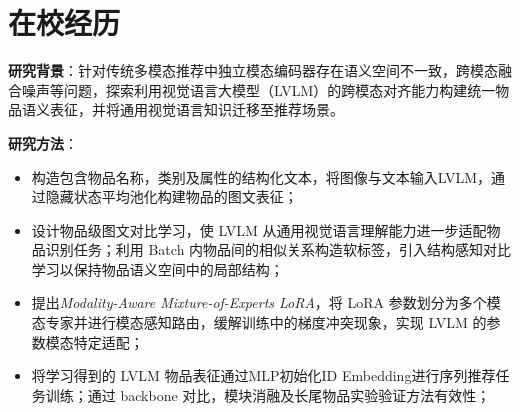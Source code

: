 \documentclass{resume}
\begin{document}




\vspace{0.5em}
\section{在校经历}



\textbf{研究背景}：针对传统多模态推荐中独立模态编码器存在语义空间不一致，跨模态融合噪声等问题，探索利用视觉语言大模型（LVLM）的跨模态对齐能力构建统一物品语义表征，并将通用视觉语言知识迁移至推荐场景。

\textbf{研究方法}：
\begin{itemize}
\item 构造包含物品名称，类别及属性的结构化文本，将图像与文本输入LVLM，通过隐藏状态平均池化构建物品的图文表征；
\item 设计物品级图文对比学习，使 LVLM 从通用视觉语言理解能力进一步适配物品识别任务；利用 Batch 内物品间的相似关系构造软标签，引入结构感知对比学习以保持物品语义空间中的局部结构；
\item 提出\textit{Modality-Aware Mixture-of-Experts LoRA}，将 LoRA 参数划分为多个模态专家并进行模态感知路由，缓解训练中的梯度冲突现象，实现 LVLM 的参数模态特定适配；
\item 将学习得到的 LVLM 物品表征通过MLP初始化ID Embedding进行序列推荐任务训练；通过 backbone 对比，模块消融及长尾物品实验验证方法有效性；
\end{itemize}
\end{document}
